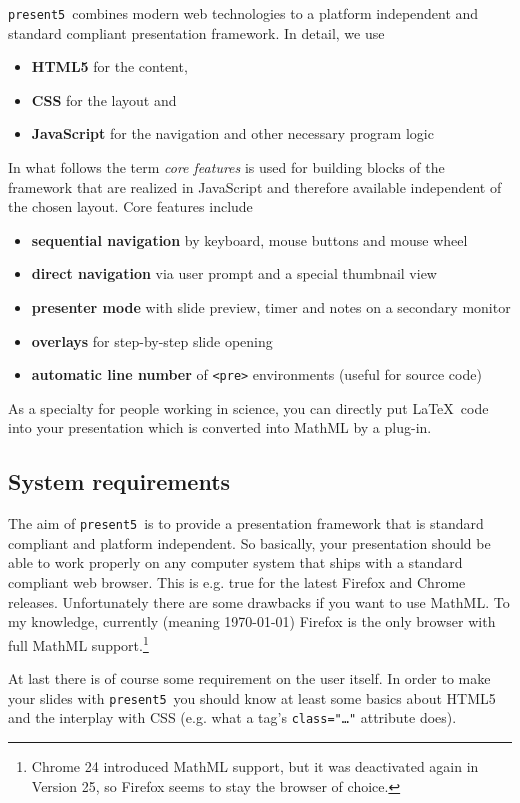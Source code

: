 \documentclass{scrartcl}
\newcommand{\present}{\code{present5}}
\newcommand{\code}[1]{{\tt #1}}
\newcommand{\tag}[1]{\code{<#1>}}
\begin{document}
\present~combines modern web technologies to a platform independent and standard compliant presentation framework. In detail, we use
\begin{itemize}
	\item {\bf HTML5} for the content,
	\item {\bf CSS} for the layout and
	\item {\bf JavaScript} for the navigation and other necessary program logic
\end{itemize}
In what follows the term \emph{core features} is used for building blocks of the framework that are realized in JavaScript and therefore available independent of the chosen layout. Core features include
\begin{itemize}
\item {\bf sequential navigation} by keyboard, mouse buttons and mouse wheel
\item {\bf direct navigation} via user prompt and a special thumbnail view
\item {\bf presenter mode} with slide preview, timer and notes on a secondary monitor
\item {\bf overlays} for step-by-step slide opening
\item {\bf automatic line number} of \tag{pre}  environments (useful for source code)
\end{itemize}
As a specialty for people working in science, you can directly put \LaTeX~code into your presentation which is converted into MathML by a plug-in.


\subsection{System requirements}
\label{subsection:systemRequirements} 


The aim of \present~is to provide a presentation framework that is standard compliant and platform independent. So basically, your presentation should be able to work properly on any computer system that ships with a standard compliant web browser. This is e.g. true for the latest Firefox and Chrome releases. Unfortunately there are some drawbacks if you want to use MathML. To my knowledge, currently (meaning \today) Firefox is the only browser with full MathML support.\footnote{Chrome 24 introduced MathML support, but it was deactivated again in Version 25, so Firefox seems to stay the browser of choice.}

At last there is of course some requirement on the user itself. In order to make your slides with \present~you should know at least some basics about HTML5 and the interplay with CSS (e.g. what a tag's \code{class="\ldots"} attribute does).
\end{document}
